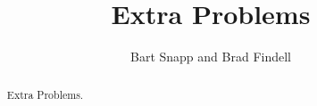 \documentclass[space,nooutcomes]{xourse}
\title{Extra Problems}
\author{Bart Snapp and Brad Findell}
\begin{document}
\begin{abstract}
Extra Problems.  
\end{abstract}
\maketitle

{}
\end{document}
